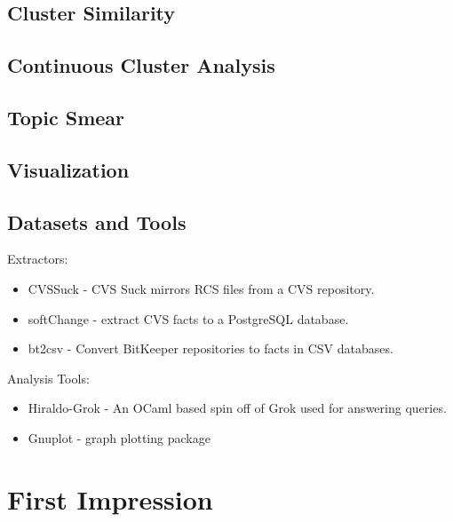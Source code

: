 \documentclass{report}
\begin{document}
\subsection{Cluster Similarity}
\subsection{Continuous Cluster Analysis}
\subsection{Topic Smear}
\subsection{Visualization}



\subsection{Datasets and Tools}

Extractors:
\begin{itemize}
\item CVSSuck - CVS Suck mirrors RCS files from a CVS repository. 
\item softChange - extract CVS facts to a PostgreSQL database.
\item bt2csv - Convert BitKeeper repositories to facts in CSV
  databases.
\end{itemize}

Analysis Tools:
\begin{itemize}
\item Hiraldo-Grok - An OCaml based spin off of Grok used for
  answering queries.
\item Gnuplot - graph plotting package
\end{itemize}









\section{First Impression}
\end{document}
